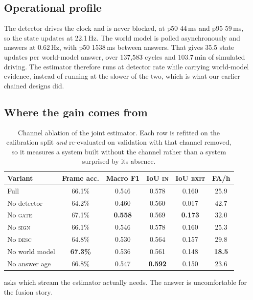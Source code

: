 \documentclass[journal]{IEEEtran}
\newcommand{\st}[1]{\textsc{#1}}
\begin{document}
\subsection{Operational profile}

The detector drives the clock and is never blocked, at p50 44\,ms and p95 59\,ms, so the state updates at 22.1\,Hz.  The world model is polled asynchronously and answers at 0.62\,Hz, with p50 1538\,ms between answers.  That gives 35.5 state updates per world-model answer, over 137{,}583 cycles and 103.7\,min of simulated driving.  The estimator therefore runs at detector rate while carrying world-model evidence, instead of running at the slower of the two, which is what our earlier chained designs did.

\subsection{Where the gain comes from}
\label{sec:jointablation}

\begin{table}[t]
\centering
\caption{Channel ablation of the joint estimator.  Each row is refitted on the calibration split \emph{and} re-evaluated on validation with that channel removed, so it measures a system built without the channel rather than a system surprised by its absence.}
\label{tab:jointablation}
\footnotesize
\setlength{\tabcolsep}{3.5pt}
\begin{tabular}{@{}lccccc@{}}
\toprule
Variant & Frame acc. & Macro F1 & IoU \st{in} & IoU \st{exit} & FA/h \\
\midrule
Full              & 66.1\% & 0.546 & 0.578 & 0.160 & 25.9 \\
No detector       & 64.2\% & 0.460 & 0.560 & 0.017 & 42.7 \\
No \st{gate}      & 67.1\% & \textbf{0.558} & 0.569 & \textbf{0.173} & 32.0 \\
No \st{sign}      & 66.1\% & 0.546 & 0.578 & 0.160 & 25.3 \\
No \st{desc}      & 64.8\% & 0.530 & 0.564 & 0.157 & 29.8 \\
No world model    & \textbf{67.3\%} & 0.536 & 0.561 & 0.148 & \textbf{18.5} \\
No answer age     & 66.8\% & 0.547 & \textbf{0.592} & 0.150 & 23.6 \\
\bottomrule
\end{tabular}
\end{table}

 asks which stream the estimator actually needs.  The answer is uncomfortable for the fusion story.
\end{document}
